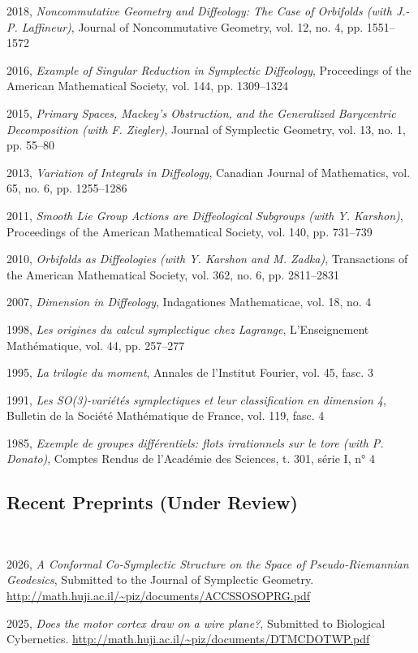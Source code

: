 \documentclass[11pt,reqno]{amsart}
\newcommand{\pubitem}[3]{\noindent\hangindent=0.5cm #1, \emph{#2}, #3\vspace{.3ex}\par}
\begin{document}
  \pubitem{2018}{Noncommutative Geometry and Diffeology: The Case of Orbifolds (with J.-P. Laffineur)}{Journal of Noncommutative Geometry, vol. 12, no. 4, pp. 1551–1572}
  
  \pubitem{2016}{Example of Singular Reduction in Symplectic Diffeology}{Proceedings of the American Mathematical Society, vol. 144, pp. 1309–1324}
  
  \pubitem{2015}{Primary Spaces, Mackey's Obstruction, and the Generalized Barycentric Decomposition (with F. Ziegler)}{Journal of Symplectic Geometry, vol. 13, no. 1, pp. 55–80}
  
  \pubitem{2013}{Variation of Integrals in Diffeology}{Canadian Journal of Mathematics, vol. 65, no. 6, pp. 1255–1286}
  
  \pubitem{2011}{Smooth Lie Group Actions are Diffeological Subgroups (with Y. Karshon)}{Proceedings of the American Mathematical Society, vol. 140, pp. 731–739}
  
  \pubitem{2010}{Orbifolds as Diffeologies (with Y. Karshon and M. Zadka)}{Transactions of the American Mathematical Society, vol. 362, no. 6, pp. 2811–2831}
  
  \pubitem{2007}{Dimension in Diffeology}{Indagationes Mathematicae, vol. 18, no. 4}
  
  \pubitem{1998}{Les origines du calcul symplectique chez Lagrange}{L'Enseignement Mathématique, vol. 44, pp. 257–277}
  
  \pubitem{1995}{La trilogie du moment}{Annales de l'Institut Fourier, vol. 45, fasc. 3}
  
  \pubitem{1991}{Les SO(3)-variétés symplectiques et leur classification en dimension 4}{Bulletin de la Société Mathématique de France, vol. 119, fasc. 4}
  
  \pubitem{1985}{Exemple de groupes différentiels: flots irrationnels sur le tore (with P. Donato)}{Comptes Rendus de l'Académie des Sciences, t. 301, série I, n° 4}
  
  \subsection*{Recent Preprints (Under Review)} \null\
  
  \pubitem{2026}{A Conformal Co-Symplectic Structure on the Space of Pseudo-Riemannian Geodesics}{Submitted to the Journal of Symplectic Geometry. \url{http://math.huji.ac.il/~piz/documents/ACCSSOSOPRG.pdf}}
  
  \pubitem{2025}{Does the motor cortex draw on a wire plane?}{Submitted to Biological Cybernetics. \url{http://math.huji.ac.il/~piz/documents/DTMCDOTWP.pdf}}
  
\end{document}
